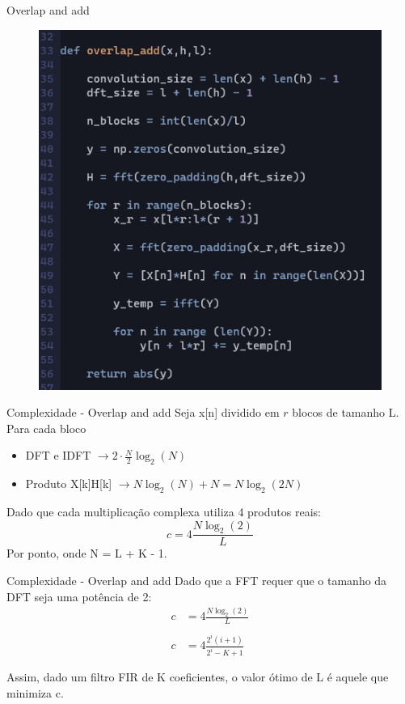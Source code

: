 \documentclass{beamer}
\begin{document}
\begin{frame}{Overlap and add}
     \begin{figure}
         \centering
         \includegraphics[scale = 0.75]{overlap.png}
     \end{figure}
\end{frame}

\begin{frame}{Complexidade - Overlap and add}
    Seja x[n] dividido em $r$ blocos de tamanho L. Para cada bloco 
    \begin{itemize}
        \item DFT e IDFT $\rightarrow  2 \cdot \frac{N}{2}\log_2{(N)}$ 
        \item Produto X[k]H[k] $\rightarrow N \log_2{(N)} + N = N \log_2{(2N)}$ 
    \end{itemize}
    Dado que cada multiplicação complexa utiliza 4 produtos reais:
    \begin{equation*}
        c = 4\frac{N \log_2{(2)}}{L}
    \end{equation*}
    Por ponto, onde N = L + K - 1. 
\end{frame}


\begin{frame}{Complexidade - Overlap and add}
    Dado que a FFT requer que o tamanho da DFT seja uma potência de 2:
    \begin{align*}
        c &= 4\frac{N \log_2{(2)}}{L} \\ \\
        c &= 4\frac{2^i(i + 1)}{2^i - K + 1} \\ \\
    \end{align*}
    Assim, dado um filtro FIR de K coeficientes, o valor ótimo de L é aquele que minimiza c. 
\end{frame}
\end{document}
